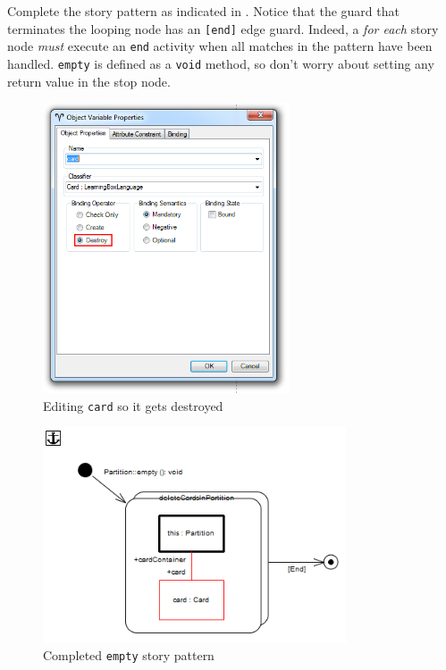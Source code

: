 \begin{stepbystep}
\item Complete the story pattern as indicated in . Notice that the guard that terminates the looping node has an
\texttt{[end]} edge guard. Indeed, a \emph{for each} story node \emph{must} execute an \texttt{end} activity when all matches in the pattern have been
handled. \texttt{empty} is defined as a \texttt{void} method, so don't worry about setting any return value in the stop node.

\begin{figure}[htbp]
\begin{center}
  \includegraphics[width=0.65\textwidth]{../../org.moflon.doc.handbook.03_storyDiagrams/06_emptyPartition/visEPImages/ea_emptyBindingOperator}
  \caption{Editing \texttt{card} so it gets destroyed}  
  \label{ea:sdm_bindingOperator}
\end{center}
\end{figure}

\begin{figure}[htbp]
\begin{center}
  \includegraphics[width=0.8\textwidth]{../../org.moflon.doc.handbook.03_storyDiagrams/06_emptyPartition/visEPImages/ea_sdmEmptyComplete}
  \caption{Completed \texttt{empty} story pattern}  
  \label{ea:sdm_end}
\end{center}
\end{figure}
\FloatBarrier


\end{stepbystep}
